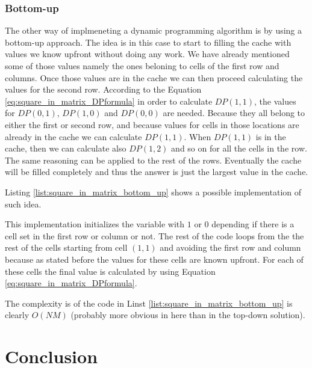 \subsubsection{Bottom-up}
\label{sec:square_in_matrix:bottom-up}
The other way of implmeneting a dynamic programming algorithm is by using a
bottom-up approach. The idea is in this case to start to filling the cache with
values we know upfront without doing any work. We have already mentioned some of
those values namely the ones beloning to cells of the first row and columns.
Once those values are in the cache we can then proceed calculating the values
for the second row. According to the Equation \ref{eq:square_in_matrix_DPformula} in order to calculate
$DP(1,1)$, the values for $DP(0,1)$, $DP(1,0)$ and $DP(0,0)$ are needed. Because
they all belong to either the first or second row, and because values for cells
in those locations are already in the cache we can calculate $DP(1,1)$. When
$DP(1,1)$ is in the cache, then we can calculate also $DP(1,2)$ and so on for
all the cells in the row. The same reasoning can be applied to the rest of the
rows. Eventually the cache will be filled completely and thus the answer is just
the largest value in the cache. 

Listing \ref{list:square_in_matrix_bottom_up} shows a possible implementation of
such idea.

This implementation initializes the  variable with $1$ or $0$
depending if there is a cell set in the first row or column or not. The rest of
the code loops from the the rest of the cells starting from cell $(1,1)$ and
avoiding the first row and column because as stated before the values for these
cells are known upfront. For each of these cells the final value is calculated
by using Equation \ref{eq:square_in_matrix_DPformula}. 

The complexity is of the code in Linst \ref{list:square_in_matrix_bottom_up} is
clearly $O(NM)$ (probably more obvious in here than in the top-down solution). 


\section{Conclusion}





